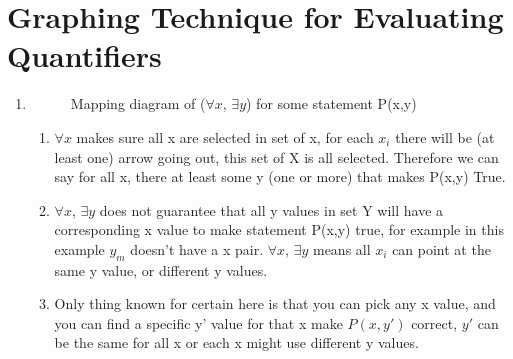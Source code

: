 \documentclass[11pt]{article}
\begin{document}
\newpage
\section*{Graphing Technique for Evaluating Quantifiers}
\begin{enumerate}
\item
\begin{figure}[ht]
\centering
{}
\caption{Mapping diagram of ($\forall x$, $\exists y$) for some statement P(x,y)}
\end{figure}
\begin{enumerate}
\item $\forall x$ makes sure all x are selected in set of x, for each $x_i$ there will be (at least one) arrow going out, this set of X is all selected. Therefore we can say for all x, there at least some y (one or more) that makes P(x,y) True.
\item $\forall x$, $\exists y$ does not guarantee that all y values in set Y will have a corresponding x value to make statement P(x,y) true, for example in this example $y_m$ doesn't have a x pair. \newline$\forall x$, $\exists y$ means all $x_i$ can point at the same y value, or different y values.
\item Only thing known for certain here is that you can pick any x value, and you can find a specific y' value for that x make $P(x, y')$ correct, $y'$ can be the same for all x or each x might use different y values.
\end{enumerate}




\end{enumerate}
\end{document}
